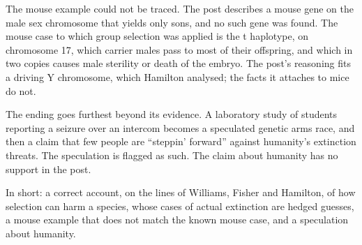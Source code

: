 \begin{afterword}
The mouse example could not be traced. The post describes a mouse gene on the male sex chromosome that yields only sons, and no such gene was found. The mouse case to which group selection was applied is the t haplotype, on chromosome 17, which carrier males pass to most of their offspring, and which in two copies causes male sterility or death of the embryo. The post's reasoning fits a driving Y chromosome, which Hamilton analysed; the facts it attaches to mice do not.

The ending goes furthest beyond its evidence. A laboratory study of students reporting a seizure over an intercom becomes a speculated genetic arms race, and then a claim that few people are ``steppin' forward'' against humanity's extinction threats. The speculation is flagged as such. The claim about humanity has no support in the post.

In short: a correct account, on the lines of Williams, Fisher and Hamilton, of how selection can harm a species, whose cases of actual extinction are hedged guesses, a mouse example that does not match the known mouse case, and a speculation about humanity.
\end{afterword}
